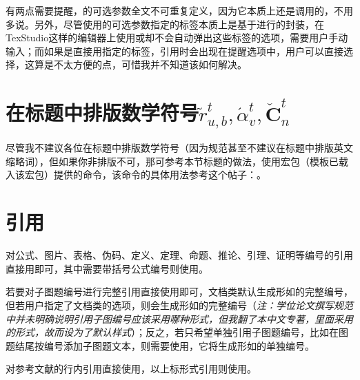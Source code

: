 \documentclass[print, doctor, vlined]{DissertUESTC}
\begin{document}
	有两点需要提醒，的可选参数全文不可重复定义，因为它本质上还是调用的，不用多说。另外，尽管使用的可选参数指定的标签本质上是基于进行的封装，在TexStudio这样的编辑器上使用或却不会自动弹出这些标签的选项，需要用户手动输入；而如果是直接用指定的标签，引用时会出现在提醒选项中，用户可以直接选择，这算是不太方便的点，可惜我并不知道该如何解决。
	
	
	\section{在标题中排版数学符号\texorpdfstring{$\tilde{r}^t_{u,b}, \acute{\alpha}^t_v, \check{\boldsymbol{C}}^t_n$}{示例}}

	尽管我不建议各位在标题中排版数学符号（因为规范甚至不建议在标题中排版英文缩略词），但如果你非排版不可，那可参考本节标题的做法，使用\href{https://mirrors.tuna.tsinghua.edu.cn/CTAN/macros/latex/contrib/hyperref/doc/hyperref-doc.pdf}{}宏包（模板已载入该宏包）提供的命令，该命令的具体用法参考这个帖子：\href{https://blog.csdn.net/qq_42679415/article/details/139592054}{}。

	
	\section{引用}
	
	对公式、图片、表格、伪码、定义、定理、命题、推论、引理、证明等编号的引用直接用即可，其中需要带括号公式编号则使用。
	
	若要对子图题编号进行完整引用直接使用即可，文档类默认生成形如的完整编号，但若用户指定了文档类的选项，则会生成形如的完整编号（\textit{注：学位论文撰写规范中并未明确说明引用子图编号应该采用哪种形式，但我翻了本中文专著，里面采用的形式，故而设为了默认样式}）；反之，若只希望单独引用子图题编号，比如在图题结尾按编号添加子图题文本，则需要使用，它将生成形如的单独编号。
	
	对参考文献的行内引用直接使用，以上标形式引用则使用。
	
\end{document}
